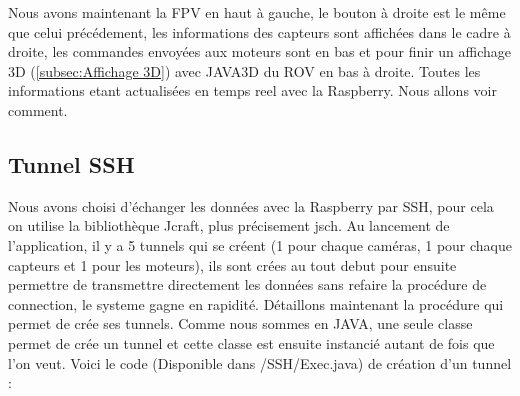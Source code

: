 \documentclass[a4paper,11pt]{report}
\begin{document}
				\newline Nous avons maintenant la FPV en haut à gauche, le bouton à droite est le même que celui précédement, les informations des capteurs sont affichées dans le cadre à droite, les commandes envoyées aux moteurs sont en bas et pour finir un affichage 3D (\ref{subsec:Affichage 3D}) avec JAVA3D du ROV en bas à droite. Toutes les informations etant actualisées en temps reel avec la Raspberry. Nous allons voir comment.
		\subsection{Tunnel SSH}
			Nous avons choisi d'échanger les données avec la Raspberry par SSH, pour cela on utilise la bibliothèque Jcraft, plus précisement jsch. Au lancement de l'application, il y a 5 tunnels qui se créent (1 pour chaque caméras, 1 pour chaque capteurs et 1 pour les moteurs), ils sont crées au tout debut pour ensuite permettre de transmettre directement les données sans refaire la procédure de connection, le systeme gagne en rapidité. 
			\newline Détaillons maintenant la procédure qui permet de crée ses tunnels. Comme nous sommes en JAVA, une seule classe permet de crée un tunnel et cette classe est ensuite instancié autant de fois que l'on veut.
			\newline Voici le code (Disponible dans /SSH/Exec.java) de création d'un tunnel :
			
\end{document}
